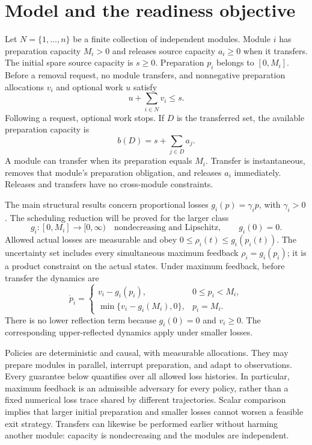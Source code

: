 \section{Model and the readiness objective}
\label{sec:model}

Let \(N=\{1,\ldots,n\}\) be a finite collection of independent modules.
Module \(i\) has preparation capacity \(M_i>0\) and releases source capacity
\(a_i\geq0\) when it transfers. The initial spare source capacity is \(s\geq0\).
Preparation \(p_i\) belongs to \([0,M_i]\). Before a removal request, no
module transfers, and nonnegative preparation allocations \(v_i\) and
optional work \(u\) satisfy
\begin{equation}
 u+\sum_{i\in N}v_i\leq s.
 \label{eq:normal-budget}
\end{equation}
Following a request, optional work stops. If \(D\) is the transferred set,
the available preparation capacity is
\begin{equation}
 b(D)=s+\sum_{j\in D}a_j.
 \label{eq:released-capacity}
\end{equation}
A module can transfer when its preparation equals \(M_i\). Transfer is
instantaneous, removes that module's preparation obligation, and releases
\(a_i\) immediately. Releases and transfers have no cross-module constraints.

The main structural results concern proportional losses
\(g_i(p)=\gamma_i p\), with \(\gamma_i>0\). The scheduling reduction will be
proved for the larger class
\begin{equation}
 g_i:[0,M_i]\longrightarrow[0,\infty)
 \quad\text{nondecreasing and Lipschitz},\qquad g_i(0)=0.
 \label{eq:smooth-class}
\end{equation}
Allowed actual losses are measurable and obey
\(0\leq\rho_i(t)\leq g_i(p_i(t))\).
The uncertainty set includes every simultaneous maximum feedback
\(\rho_i=g_i(p_i)\); it is a product constraint on the actual states.
Under maximum feedback, before transfer the dynamics are
\begin{equation}
 \dot p_i=
 \begin{cases}
 v_i-g_i(p_i),&0\leq p_i<M_i,\\
 \min\{v_i-g_i(M_i),0\},&p_i=M_i.
 \end{cases}
 \label{eq:reflected-dynamics}
\end{equation}
There is no lower reflection term because \(g_i(0)=0\) and \(v_i\geq0\).
The corresponding upper-reflected dynamics apply under smaller losses.

Policies are deterministic and causal, with measurable allocations. They may
prepare modules in parallel, interrupt preparation, and adapt to observations.
Every guarantee below quantifies over all allowed loss histories. In
particular, maximum feedback is an admissible adversary for every policy,
rather than a fixed numerical loss trace shared by different trajectories.
Scalar comparison implies that larger initial preparation and smaller losses
cannot worsen a feasible exit strategy. Transfers can likewise be performed
earlier without harming another module: capacity is nondecreasing and the
modules are independent.

